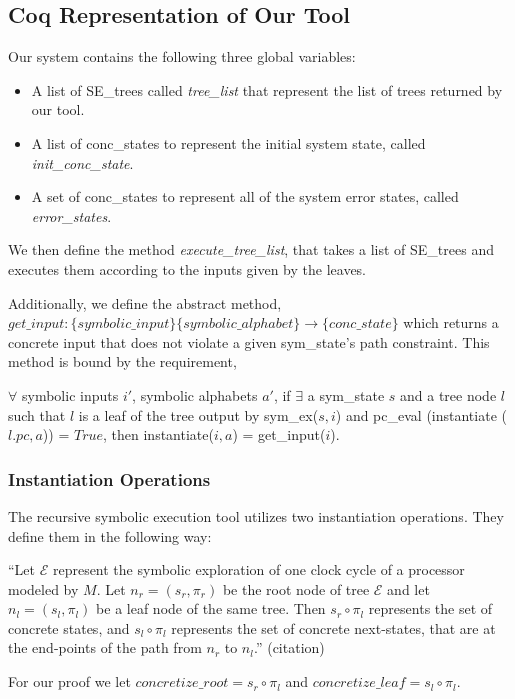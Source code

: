 \subsection{Coq Representation of Our Tool}
Our system contains the following three global variables:
\begin{itemize}
\item A list of SE\_trees called \textit{tree\_list} that represent the list of trees returned by our tool.
\item A list of conc\_states to represent the initial system state, called \textit{init\_conc\_state}.
\item A set of conc\_states to represent all of the system error states, called \textit{error\_states}.
\end{itemize}

We then define the method \textit{execute\_tree\_list}, that takes a list of SE\_trees and executes them according to the inputs given by the leaves.

Additionally, we define the abstract method, $ get\_input : \{symbolic\_input\} \{symbolic\_alphabet\} \rightarrow \{conc\_state\}$ which returns a concrete input that does not violate a given sym\_state's path constraint.
This method is bound by the requirement,
\begin{axiom}
$ \forall$ symbolic inputs $i'$, symbolic alphabets $a'$, 
if $\exists$ a sym\_state $s$ and a tree node $l$ such that
$ l$ is a leaf of the tree output by sym\_ex($s, i$) and 
pc\_eval (instantiate ($l.pc, a$)) = $True$, then
instantiate($i, a$) = get\_input($i$).
\end{axiom}

\subsubsection{Instantiation Operations}
The recursive symbolic execution tool utilizes two instantiation operations. 
They define them in the following way: 

``Let $\mathcal{E}$ represent the symbolic exploration of one clock cycle of a processor modeled by $M$. Let $n_r = (s_r,\pi_r)$ be the root node of tree $\mathcal{E}$ and let $n_l = (s_l,\pi_l)$ be a leaf node of the same tree. 
Then $s_r \circ \pi_l$ represents the set of concrete states, and $s_l \circ \pi_l$ represents the set of concrete next-states, that are at the end-points of the path from $n_r$ to $n_l$.'' (citation)

For our proof we let $concretize\_root=  s_r \circ \pi_l$ and $concretize\_leaf =  s_l \circ \pi_l$.

